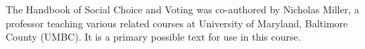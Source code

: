 The Handbook of Social Choice and Voting was co-authored by Nicholas Miller, a professor teaching various related courses at University of Maryland, Baltimore County (UMBC).  It is a primary possible text for use in this course.
